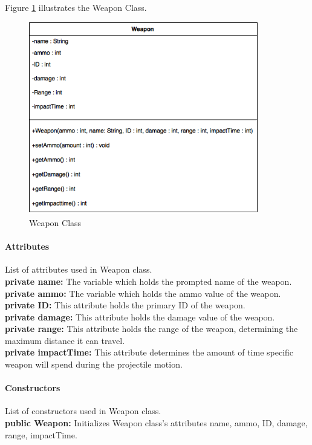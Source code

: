 \documentclass[12pt]{article} %
\begin{document}
Figure \ref{fig:weapon} illustrates the Weapon Class.
\begin{figure}[h!]
   \centering
   \vspace{10pt}%
   \includegraphics[width=10cm]{weapon.png}
   \caption{Weapon Class}
   \label{fig:weapon}
\end{figure}

\paragraph{Attributes\\}

List of attributes used in Weapon class.\\
\textbf{private name:} The variable which holds the prompted name of the weapon.\\
\textbf{private ammo:} The variable which holds the ammo value of the weapon.\\
\textbf{private ID:} This attribute holds the primary ID of the weapon.\\
\textbf{private damage:} This attribute holds the damage value of the weapon.\\
\textbf{private range:} This attribute holds the range of the weapon, determining the maximum distance it can travel. \\
\textbf{private impactTime:} This attribute determines the amount of time specific weapon will spend during the projectile motion. \\

\paragraph{Constructors \\}
List of constructors used in Weapon class.\\
\textbf{public Weapon:} Initializes Weapon class's attributes name, ammo, ID, damage, range, impactTime.
\end{document}
